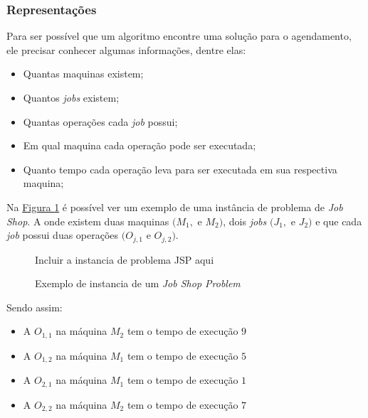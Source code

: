         \subsubsection{Representações}
            Para ser possível que um algoritmo encontre uma solução para o agendamento, ele precisar conhecer algumas informações, dentre elas: 
            \begin{itemize}
                \item Quantas maquinas existem;
                \item Quantos \textit{jobs} existem;
                \item Quantas operações cada \textit{job} possui;
                \item Em qual maquina cada operação pode ser executada;
                \item Quanto tempo cada operação leva para ser executada em sua respectiva maquina;
            \end{itemize}


            Na 
            \hyperref[fig:ex-instancia-problema-JSP]{Figura \ref{fig:ex-instancia-problema-JSP}}
            é possível ver um exemplo de uma instância de problema de \textit{Job Shop}. A onde existem duas maquinas $(M_1, $ e $M_2)$, dois \textit{jobs} $(J_1, $ e $J_2)$ e que cada \textit{job} possui duas operações $(O_{j,1} $ e $O_{j,2})$.\hfill\vspace{\onelineskip}

            \begin{figure}[ht]
                \centering
                \small{Incluir a instancia de problema JSP aqui}
                \caption{Exemplo de instancia de um \textit{Job Shop Problem}}
                \label{fig:ex-instancia-problema-JSP}
            \end{figure}
            
            Sendo assim:\hfill
            \begin{itemize}
                \item A $O_{1,1}$ na máquina $M_2$ tem o tempo de execução $9$
                \item A $O_{1,2}$ na máquina $M_1$ tem o tempo de execução $5$
                \item A $O_{2,1}$ na máquina $M_1$ tem o tempo de execução $1$
                \item A $O_{2,2}$ na máquina $M_2$ tem o tempo de execução $7$
            \end{itemize}            
            
